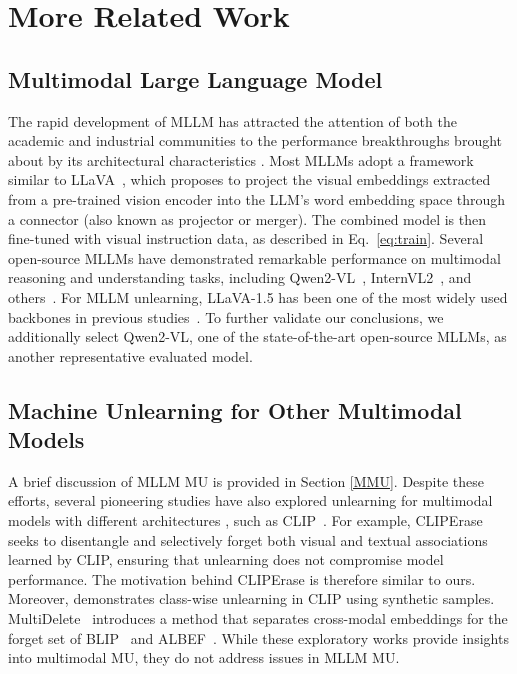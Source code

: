 \section{More Related Work}\label{app:rk}
\subsection{Multimodal Large Language Model}
The rapid development of MLLM has attracted the attention of both the academic and industrial communities to the performance breakthroughs brought about by its architectural characteristics \cite{huang2024survey,mai2024efficient,yan2024urbanclip,yan2024georeasoner}. Most MLLMs adopt a framework similar to LLaVA~\cite{liu2024llava}, which proposes to project the visual embeddings extracted from a pre-trained vision encoder into the LLM’s word embedding space through a connector (also known as projector or merger). The combined model is then fine-tuned with visual instruction data, as described in Eq.~\ref{eq:train}. Several open-source MLLMs have demonstrated remarkable performance on multimodal reasoning and understanding tasks, including Qwen2-VL~\cite{wang2024qwen2vl}, InternVL2~\cite{chen2024internvl}, and others~\cite{glm2024chatglm,li2024llavaonevision}. For MLLM unlearning, LLaVA-1.5 has been one of the most widely used backbones in previous studies~\cite{li2024siu,liu2024mllmubench,dontsov2024clear}. To further validate our conclusions, we additionally select Qwen2-VL, one of the state-of-the-art open-source MLLMs, as another representative evaluated model.

\subsection{Machine Unlearning for Other Multimodal Models}
A brief discussion of MLLM MU is provided in Section \ref{MMU}. Despite these efforts, several pioneering studies have also explored unlearning for multimodal models with different architectures \cite{liu2024multimodal,li2025machine,tang2024learn,gao2024practical,gao2024meta}, such as CLIP~\cite{radford2021clip}. For example, CLIPErase~\cite{yang2024cliperase} seeks to disentangle and selectively forget both visual and textual associations learned by CLIP, ensuring that unlearning does not compromise model performance. The motivation behind CLIPErase is therefore similar to ours. Moreover, \citep{kravets2024zero} demonstrates class-wise unlearning in CLIP using synthetic samples. MultiDelete~\cite{cheng2024multidelete} introduces a method that separates cross-modal embeddings for the forget set of BLIP~\cite{li2022blip} and ALBEF~\cite{li2021albef}. While these exploratory works provide insights into multimodal MU, they do not address issues in MLLM MU.

